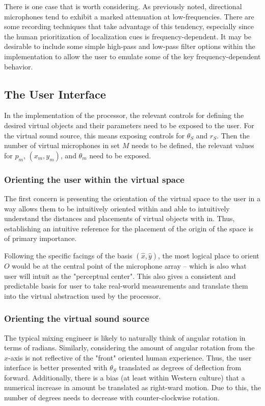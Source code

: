 There is one case that is worth considering. As previously noted, directional microphones tend to exhibit a marked attenuation at low-frequencies. There are some recording techniques that take advantage of this tendency, especially since the human prioritization of localization cues is frequency-dependent. It may be desirable to include some simple high-pass and low-pass filter options within the implementation to allow the user to emulate some of the key frequency-dependent behavior.

\subsection{The User Interface}

In the implementation of the processor, the relevant controls for defining the desired virtual objects and their parameters need to be exposed to the user. For the virtual sound source, this means exposing controls for $\theta_S$ and $r_S$. Then the number of virtual microphones in set $M$ needs to be defined, the relevant values for $p_m$, $(x_m,y_m)$, and $\theta_m$ need to be exposed.

\subsubsection{Orienting the user within the virtual space} The first concern is presenting the orientation of the virtual space to the user in a way allows them to be intuitively oriented within and able to intuitively understand the distances and placements of virtual objects with in. Thus, establishing an intuitive reference for the placement of the origin of the space is of primary importance.

Following the specific facings of the basis $(\hat{x},\hat{y})$, the most logical place to orient $O$ would be at the central point of the microphone array -- which is also what user will intuit as the "perceptual center". This also gives a consistent and predictable basis for user to take real-world measurements and translate them into the virtual abstraction used by the processor.

\subsubsection{Orienting the virtual sound source} The typical mixing engineer is likely to naturally think of angular rotation in terms of radians. Similarly, considering the amount of angular rotation from the $x$-axis is not reflective of the "front" oriented human experience. Thus, the user interface is better presented with $\theta_S$ translated as degrees of deflection from forward. Additionally, there is a bias (at least within Western culture) that a numerical increase in amount be translated as right-ward motion. Due to this, the number of degrees needs to decrease with counter-clockwise rotation.

